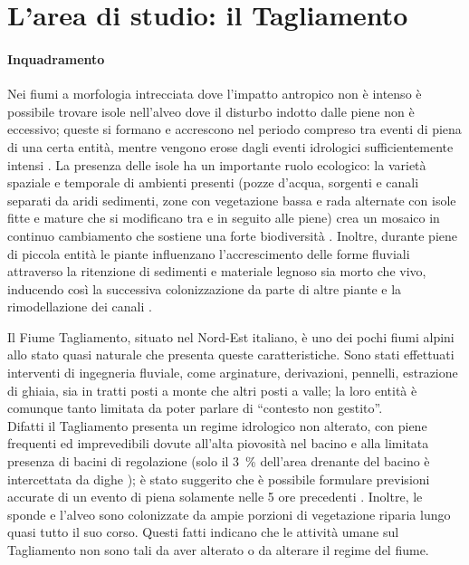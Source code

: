 \section{L'area di studio: il Tagliamento}
\label{sec:descr-area-studio}
\paragraph{Inquadramento}
Nei fiumi a morfologia intrecciata dove l'impatto antropico non è intenso è possibile trovare isole nell'alveo dove il disturbo indotto dalle piene non è eccessivo;
queste si formano e accrescono nel periodo compreso tra eventi di piena di una certa entità, mentre vengono erose dagli eventi idrologici sufficientemente intensi .
La presenza delle isole ha un importante ruolo ecologico: la varietà spaziale e temporale di ambienti presenti (pozze d'acqua, sorgenti e canali separati da aridi sedimenti, zone con vegetazione bassa e rada alternate con isole fitte e mature che si modificano tra e in seguito alle piene) crea un mosaico in continuo cambiamento che sostiene una forte biodiversità .
Inoltre, durante piene di piccola entità le piante influenzano l'accrescimento delle forme fluviali attraverso la ritenzione di sedimenti e materiale legnoso sia morto che vivo, inducendo così la successiva colonizzazione da parte di altre piante e la rimodellazione dei canali .


Il Fiume Tagliamento, situato nel Nord-Est italiano, è uno dei pochi fiumi alpini allo stato quasi naturale che presenta queste caratteristiche. 
Sono stati effettuati interventi di ingegneria fluviale, come arginature, derivazioni, pennelli, estrazione di ghiaia, sia in tratti posti a monte che altri posti a valle; la loro entità è comunque tanto limitata da poter parlare di “contesto non gestito”.
\\
Difatti il Tagliamento presenta un regime idrologico non alterato, con piene frequenti ed imprevedibili dovute all'alta piovosità nel bacino  e alla limitata presenza di bacini di regolazione (solo il \SI{3}{\percent} dell'area drenante del bacino è intercettata da dighe );
è stato suggerito che è possibile formulare previsioni accurate di un evento di piena solamente nelle 5 ore precedenti .
Inoltre, le sponde e l'alveo sono colonizzate da ampie porzioni di vegetazione riparia lungo quasi tutto il suo corso. 
Questi fatti indicano che le attività umane sul Tagliamento non sono tali da aver alterato o da alterare il regime del fiume.


